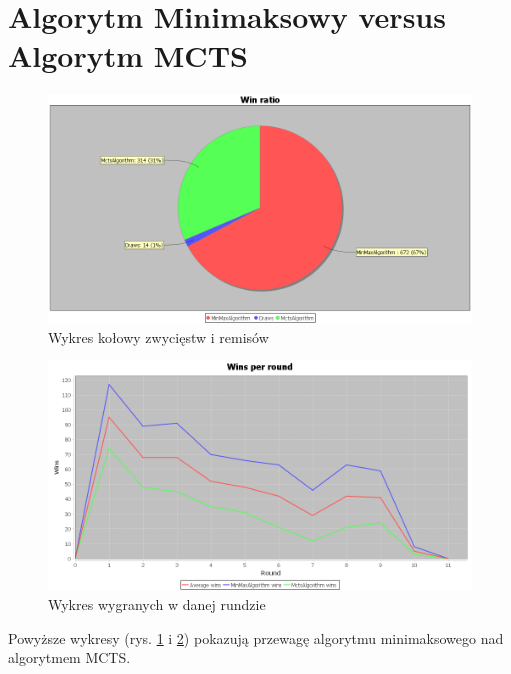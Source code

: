 \clearpage
\section{Algorytm Minimaksowy versus Algorytm MCTS}

\begin{figure}[H]
	\centering
	\includegraphics[width=\textwidth]{Resources/MirrorMmVsMcts/MmVsMctsWin.PNG}
	\caption{Wykres kołowy zwycięstw i remisów} 
	\label{fig:MmVsMctsWin}
\end{figure}

\begin{figure}[H]
	\centering
	\includegraphics[width=\textwidth]{Resources/MirrorMmVsMcts/MmVsMctsRoundWin.PNG}
	\caption{Wykres wygranych w danej rundzie} 
	\label{fig:MmVsMctsRoundWin}
\end{figure}

Powyższe wykresy (rys. \ref{fig:MmVsMctsWin} i \ref{fig:MmVsMctsRoundWin}) pokazują przewagę algorytmu minimaksowego nad algorytmem MCTS.

